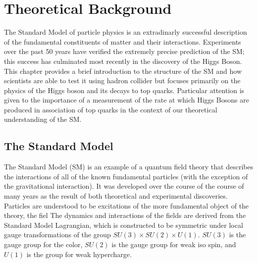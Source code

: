 \chapter[Theorteical Background][Theorectical Background]{Theoretical Background}

The Standard Model of particle physics is an extradinarly successful
description of the fundamental constituents of matter and their interactions.
Experiments over the past 50 years have verified the extremely precise
prediction of the SM; this success has culminated most recently in the
discovery of the Higgs Boson.  This chapter provides a brief introduction to
the structure of the SM and how scientists are able to test it using hadron
collider but focuses primarily on the physics of the Higgs boson and its decays
to top quarks.  Particular attention is given to the importance of a
measurement of the rate at which Higgs Bosons are produced in association of
top quarks in the context of our theoretical understanding of the SM. 


\section{The Standard Model}

The Standard Model (SM) is an example of a quantum field theory that describes
the interactions of all of the known fundamental particles (with the exception
    of the gravitational interaction). It was developed over the course of the
course of many years as the result of both theoretical and experimental
discoveries. Particles are understood to be excitations of the more fundamental
object of the theory, the fiel The dynamics and interactions of the fields are
derived from the Standard Model Lagrangian, which is constructed to be
symmetric under local gauge transformations of the group $SU(3) \times SU(2)
  \times U(1)$. $SU(3)$ is the gauge group for the color, $SU(2)$ is the gauge
  group for weak iso spin, and $U(1)$ is the group for weak hypercharge. 

